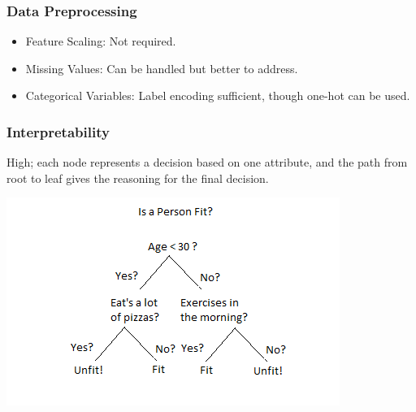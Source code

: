 \documentclass[english, threecolumn]{latex4ei/latex4ei_sheet}
\begin{document}
\begin{sectionbox}
\subsubsection{Data Preprocessing}
\begin{itemize}
    \item Feature Scaling: Not required.
    \item Missing Values: Can be handled but better to address.
    \item Categorical Variables: Label encoding sufficient, though one-hot can be used.
\end{itemize}

\subsubsection{Interpretability}
High; each node represents a decision based on one attribute, and the path from root to leaf gives the reasoning for the final decision.

\includegraphics[width=0.5\linewidth]{img/Decision-Trees-modified-1.png}
\end{sectionbox}
\end{document}
